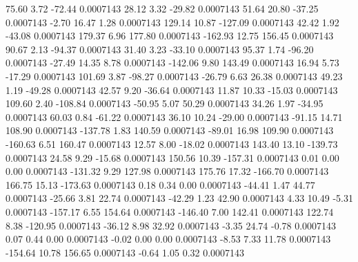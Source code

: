        75.60        3.72      -72.44     0.0007143
       28.12        3.32      -29.82     0.0007143
       51.64       20.80      -37.25     0.0007143
       -2.70       16.47        1.28     0.0007143
      129.14       10.87     -127.09     0.0007143
       42.42        1.92      -43.08     0.0007143
      179.37        6.96      177.80     0.0007143
     -162.93       12.75      156.45     0.0007143
       90.67        2.13      -94.37     0.0007143
       31.40        3.23      -33.10     0.0007143
       95.37        1.74      -96.20     0.0007143
      -27.49       14.35        8.78     0.0007143
     -142.06        9.80      143.49     0.0007143
       16.94        5.73      -17.29     0.0007143
      101.69        3.87      -98.27     0.0007143
      -26.79        6.63       26.38     0.0007143
       49.23        1.19      -49.28     0.0007143
       42.57        9.20      -36.64     0.0007143
       11.87       10.33      -15.03     0.0007143
      109.60        2.40     -108.84     0.0007143
      -50.95        5.07       50.29     0.0007143
       34.26        1.97      -34.95     0.0007143
       60.03        0.84      -61.22     0.0007143
       36.10       10.24      -29.00     0.0007143
      -91.15       14.71      108.90     0.0007143
     -137.78        1.83      140.59     0.0007143
      -89.01       16.98      109.90     0.0007143
     -160.63        6.51      160.47     0.0007143
       12.57        8.00      -18.02     0.0007143
      143.40       13.10     -139.73     0.0007143
       24.58        9.29      -15.68     0.0007143
      150.56       10.39     -157.31     0.0007143
        0.01        0.00        0.00     0.0007143
     -131.32        9.29      127.98     0.0007143
      175.76       17.32     -166.70     0.0007143
      166.75       15.13     -173.63     0.0007143
        0.18        0.34        0.00     0.0007143
      -44.41        1.47       44.77     0.0007143
      -25.66        3.81       22.74     0.0007143
      -42.29        1.23       42.90     0.0007143
        4.33       10.49       -5.31     0.0007143
     -157.17        6.55      154.64     0.0007143
     -146.40        7.00      142.41     0.0007143
      122.74        8.38     -120.95     0.0007143
      -36.12        8.98       32.92     0.0007143
       -3.35       24.74       -0.78     0.0007143
        0.07        0.44        0.00     0.0007143
       -0.02        0.00        0.00     0.0007143
       -8.53        7.33       11.78     0.0007143
     -154.64       10.78      156.65     0.0007143
       -0.64        1.05        0.32     0.0007143
